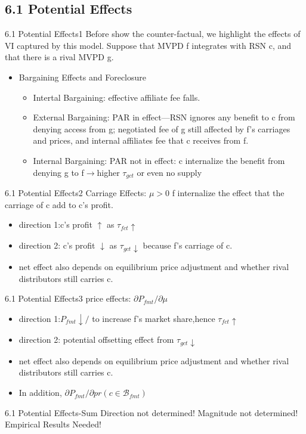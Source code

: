 \documentclass[10pt]{beamer}
\begin{document}
\subsection{6.1 Potential Effects}
\begin{frame}{6.1 Potential Effects1}
    Before show the counter-factual, we highlight the effects of VI captured by this model. Suppose that MVPD f integrates with RSN c, and that there is a rival MVPD g.
    \begin{itemize}
        \item Bargaining Effects and Foreclosure
        \begin{itemize}
            \item Intertal Bargaining: effective affiliate fee falls.
            \item External Bargaining: PAR in effect---RSN ignores any benefit to c from denying access from g; negotiated fee of g still affected by f's carriages and prices, and internal affiliates fee that c receives from f.
            \item Internal Bargaining: PAR not in effect: c internalize the benefit from denying g to f$\rightarrow$higher $\tau_{gct}$ or even no supply
        \end{itemize}
    \end{itemize}
\end{frame}
\begin{frame}{6.1 Potential Effects2}
    Carriage Effects: $\mu>0$ f internalize the effect that the carriage of c add to c's profit.
        \begin{itemize}
            \item direction 1:c's profit $\uparrow$ as $\tau_{fct}\uparrow$ 
            \item direction 2: c's profit $\downarrow$ as $\tau_{gct}\downarrow$ because f's carriage of c.
            \item net effect also depends on equilibrium price adjustment and whether rival distributors still carries c.
        \end{itemize}
\end{frame}
\begin{frame}{6.1 Potential Effects3}
    price effects: $\partial{P_{fmt}}/\partial{\mu}$
        \begin{itemize}
            \item direction 1:$P_{fmt}\downarrow/$ to increase f's market share,hence $\tau_{fct}\uparrow$
            \item direction 2: potential offsetting effect from $\tau_{gct}\downarrow$
            \item net effect also depends on equilibrium price adjustment and whether rival distributors still carries c.
            \item In addition, $\partial{P_{fmt}}/\partial{pr(c\in \mathcal{B}_{fmt})}$ 
        \end{itemize}
\end{frame}
\begin{frame}{6.1 Potential Effects-Sum}
    Direction not determined! Magnitude not determined! Empirical Results Needed!
\end{frame}
\end{document}
